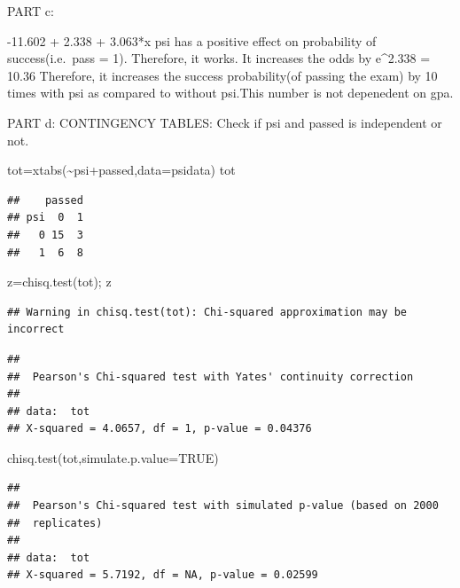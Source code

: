 \documentclass[
]{article}
\newenvironment{Shaded}{\begin{snugshade}}{\end{snugshade}}
\newcommand{\AttributeTok}[1]{\textcolor[rgb]{0.77,0.63,0.00}{#1}}
\newcommand{\ConstantTok}[1]{\textcolor[rgb]{0.00,0.00,0.00}{#1}}
\newcommand{\FunctionTok}[1]{\textcolor[rgb]{0.00,0.00,0.00}{#1}}
\newcommand{\NormalTok}[1]{#1}
\newcommand{\OtherTok}[1]{\textcolor[rgb]{0.56,0.35,0.01}{#1}}
\newcommand{\SpecialCharTok}[1]{\textcolor[rgb]{0.00,0.00,0.00}{#1}}
\begin{document}
PART c:

-11.602 + 2.338 + 3.063*x psi has a positive effect on probability of
success(i.e.~pass = 1). Therefore, it works. It increases the odds by
e\^{}2.338 = 10.36 Therefore, it increases the success probability(of
passing the exam) by 10 times with psi as compared to without psi.This
number is not depenedent on gpa.

PART d: CONTINGENCY TABLES: Check if psi and passed is independent or
not.

\begin{Shaded}
\begin{Highlighting}[]
\NormalTok{tot}\OtherTok{=}\FunctionTok{xtabs}\NormalTok{(}\SpecialCharTok{\textasciitilde{}}\NormalTok{psi}\SpecialCharTok{+}\NormalTok{passed,}\AttributeTok{data=}\NormalTok{psidata)}
\NormalTok{tot}
\end{Highlighting}
\end{Shaded}

\begin{verbatim}
##    passed
## psi  0  1
##   0 15  3
##   1  6  8
\end{verbatim}

\begin{Shaded}
\begin{Highlighting}[]
\NormalTok{z}\OtherTok{=}\FunctionTok{chisq.test}\NormalTok{(tot); z}
\end{Highlighting}
\end{Shaded}

\begin{verbatim}
## Warning in chisq.test(tot): Chi-squared approximation may be incorrect
\end{verbatim}

\begin{verbatim}
## 
##  Pearson's Chi-squared test with Yates' continuity correction
## 
## data:  tot
## X-squared = 4.0657, df = 1, p-value = 0.04376
\end{verbatim}

\begin{Shaded}
\begin{Highlighting}[]
\FunctionTok{chisq.test}\NormalTok{(tot,}\AttributeTok{simulate.p.value=}\ConstantTok{TRUE}\NormalTok{)}
\end{Highlighting}
\end{Shaded}

\begin{verbatim}
## 
##  Pearson's Chi-squared test with simulated p-value (based on 2000
##  replicates)
## 
## data:  tot
## X-squared = 5.7192, df = NA, p-value = 0.02599
\end{verbatim}
\end{document}
